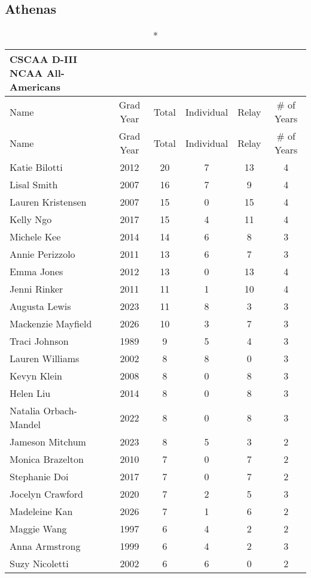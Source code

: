 \subsection{Athenas}

\begin{longtable}{lccccc}
\caption*{CSCAA D-III NCAA All-Americans} \\
\toprule
Name & Grad Year & Total & Individual & Relay & \# of Years \\
\midrule
\endfirsthead

\toprule
Name & Grad Year & Total & Individual & Relay & \# of Years \\
\midrule
\endhead

\bottomrule
\endfoot

Katie Bilotti & 2012 & 20 & 7 & 13 & 4 \\
Lisal Smith & 2007 & 16 & 7 & 9 & 4 \\
Lauren Kristensen & 2007 & 15 & 0 & 15 & 4 \\
Kelly Ngo & 2017 & 15 & 4 & 11 & 4 \\
Michele Kee & 2014 & 14 & 6 & 8 & 3 \\
Annie Perizzolo & 2011 & 13 & 6 & 7 & 3 \\
Emma Jones & 2012 & 13 & 0 & 13 & 4 \\
Jenni Rinker & 2011 & 11 & 1 & 10 & 4 \\
Augusta Lewis & 2023 & 11 & 8 & 3 & 3 \\
Mackenzie Mayfield & 2026 & 10 & 3 & 7 & 3 \\
Traci Johnson & 1989 & 9 & 5 & 4 & 3 \\
Lauren Williams & 2002 & 8 & 8 & 0 & 3 \\
Kevyn Klein & 2008 & 8 & 0 & 8 & 3 \\
Helen Liu & 2014 & 8 & 0 & 8 & 3 \\
Natalia Orbach-Mandel & 2022 & 8 & 0 & 8 & 3 \\
Jameson Mitchum & 2023 & 8 & 5 & 3 & 2 \\
Monica Brazelton & 2010 & 7 & 0 & 7 & 2 \\
Stephanie Doi & 2017 & 7 & 0 & 7 & 2 \\
Jocelyn Crawford & 2020 & 7 & 2 & 5 & 3 \\
Madeleine Kan & 2026 & 7 & 1 & 6 & 2 \\
Maggie Wang & 1997 & 6 & 4 & 2 & 2 \\
Anna Armstrong & 1999 & 6 & 4 & 2 & 3 \\
Suzy Nicoletti & 2002 & 6 & 6 & 0 & 2 \\

\end{longtable}
